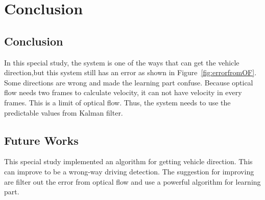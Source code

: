 \setlength{\footskip}{8mm}

\chapter{Conclusion}
\label{ch:results}




\section{Conclusion}
\label{Conclusion}
In this special study, the system is one of the ways that can get the vehicle direction,but this system still has an error as shown in Figure~\ref{fig:errorfromOF}.
Some directions are wrong and made the learning part confuse. Because optical flow needs two frames to calculate velocity, it can not have velocity in every frames. This is a limit of optical flow. Thus, the system needs to use the predictable values from Kalman filter.


\section{Future Works}
This special study implemented an algorithm for getting vehicle direction. This can improve to be a wrong-way driving detection. The suggestion for improving are filter out the error from optical flow and use a powerful algorithm for learning part.

\FloatBarrier

